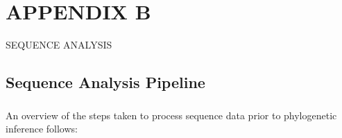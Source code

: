 \chapter*{APPENDIX B}
\begin{center}
SEQUENCE ANALYSIS
\end{center}

\section*{Sequence Analysis Pipeline}

\paragraph{} An overview of the steps taken to process sequence data prior to phylogenetic inference follows:

\newenvironment{seqlist}
{\begin{enumerate}
    \setlength{\itemsep}{0pt}
    \setlength{\parskip}{0pt}
    \setlength{\parsep}{0pt} }
{\end{enumerate} } 


